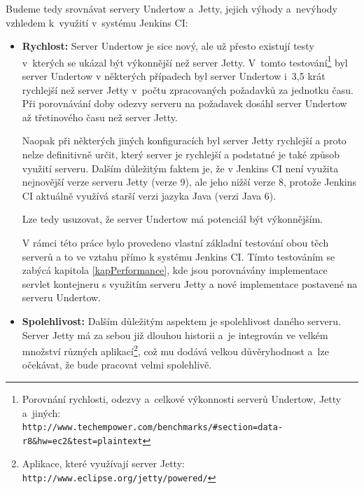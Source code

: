             \medskip
            Budeme tedy srovnávat servery Undertow a~Jetty, jejich výhody a~nevýhody
            vzhledem k~využití v~systému Jenkins CI:
            \begin{itemize}
                \item {\textbf{Rychlost:} Server Undertow je sice nový, ale už přesto existují
                    testy v~kterých se ukázal být výkonnější než server Jetty. V~tomto           
                    testování\footnote{Porovnání rychlosti, odezvy a~celkové výkonnosti serverů Undertow, Jetty a~jiných: 
                    \\\texttt{http://www.techempower.com/benchmarks/\#section=data-r8\&hw=ec2\&test=plaintext}}
                    byl server Undertow v některých případech byl server 
                    Undertow i~3,5 krát rychlejší než server Jetty v~počtu zpracovaných 
                    požadavků za jednotku času. Při porovnávání doby odezvy serveru na požadavek 
                    dosáhl server Undertow až třetinového času než server Jetty. 
                    
                    Naopak při některých
                    jiných konfiguracích byl server Jetty rychlejší a proto nelze definitivně určit,
                    který server je rychlejší a podstatné je také způsob využití serveru. 
                    Dalším důležitým faktem je, že v Jenkins CI není využita nejnovější verze serveru
                    Jetty (verze 9), ale jeho nižší verze 8, protože Jenkins CI aktuálně využívá
                    starší verzi jazyka Java (verzi Java 6).
                    
                    Lze tedy usuzovat, že server Undertow má potenciál být výkonnějším.
        
                    V rámci této práce bylo provedeno vlastní základní testování 
                    obou těch serverů a to ve vztahu přímo k systému Jenkins CI. Tímto testováním
                    se zabýcá kapitola \ref{kapPerformance}, kde jsou porovnávány 
                    implementace servlet kontejneru s využitím serveru Jetty a nové implementace 
                    postavené na serveru Undertow.
                    }

                \item{\textbf{Spolehlivost:} Dalším důležitým aspektem je spolehlivost daného serveru. 
                        Server Jetty má za sebou již dlouhou historii a~je integrován ve velkém množství
                        různých aplikací\footnote{Aplikace, které využívají server Jetty: \texttt{http://www.eclipse.org/jetty/powered/}},
                        což mu dodává velkou důvěryhodnost a~lze očekávat, že bude pracovat velmi 
                        spolehlivě. 
                        
}
\end{itemize}
